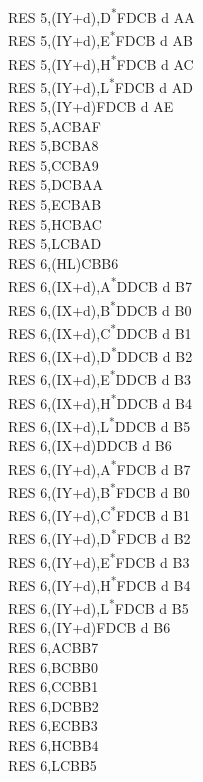 \documentclass[twoside,openright,a4paper]{book}
\begin{document}
\begin{multicols}{3}
{\begin{tabbing}
	RES 5,(IY+d),D\textsuperscript{*}\>FDCB d AA\\
	RES 5,(IY+d),E\textsuperscript{*}\>FDCB d AB\\
	RES 5,(IY+d),H\textsuperscript{*}\>FDCB d AC\\
	RES 5,(IY+d),L\textsuperscript{*}\>FDCB d AD\\
	RES 5,(IY+d)\>FDCB d AE\\
	RES 5,A\>CBAF\\
	RES 5,B\>CBA8\\
	RES 5,C\>CBA9\\
	RES 5,D\>CBAA\\
	RES 5,E\>CBAB\\
	RES 5,H\>CBAC\\
	RES 5,L\>CBAD\\
	RES 6,(HL)\>CBB6\\
	RES 6,(IX+d),A\textsuperscript{*}\>DDCB d B7\\
	RES 6,(IX+d),B\textsuperscript{*}\>DDCB d B0\\
	RES 6,(IX+d),C\textsuperscript{*}\>DDCB d B1\\
	RES 6,(IX+d),D\textsuperscript{*}\>DDCB d B2\\
	RES 6,(IX+d),E\textsuperscript{*}\>DDCB d B3\\
	RES 6,(IX+d),H\textsuperscript{*}\>DDCB d B4\\
	RES 6,(IX+d),L\textsuperscript{*}\>DDCB d B5\\
	RES 6,(IX+d)\>DDCB d B6\\
	RES 6,(IY+d),A\textsuperscript{*}\>FDCB d B7\\
	RES 6,(IY+d),B\textsuperscript{*}\>FDCB d B0\\
	RES 6,(IY+d),C\textsuperscript{*}\>FDCB d B1\\
	RES 6,(IY+d),D\textsuperscript{*}\>FDCB d B2\\
	RES 6,(IY+d),E\textsuperscript{*}\>FDCB d B3\\
	RES 6,(IY+d),H\textsuperscript{*}\>FDCB d B4\\
	RES 6,(IY+d),L\textsuperscript{*}\>FDCB d B5\\
	RES 6,(IY+d)\>FDCB d B6\\
	RES 6,A\>CBB7\\
	RES 6,B\>CBB0\\
	RES 6,C\>CBB1\\
	RES 6,D\>CBB2\\
	RES 6,E\>CBB3\\
	RES 6,H\>CBB4\\
	RES 6,L\>CBB5\\

\end{tabbing}}
\end{multicols}
\end{document}
